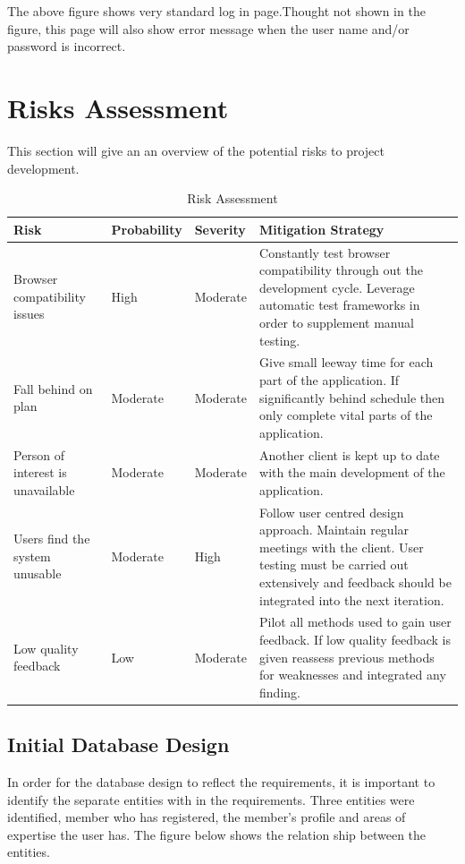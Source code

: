 \documentclass[a4paper,oneside,11pt]{report}
\begin{document}
The above figure shows very standard log in page.Thought not shown in the figure, this page will also show error message when the user name and/or password is incorrect.

\chapter{Risks Assessment}
 	This section will give an an overview of the potential risks to project development.
\begin{center}
	\begin{table}[!ht]
    \begin{tabular}[ht]{| l | l | l | p{5cm} |}
    \hline
    Risk & Probability & Severity & Mitigation Strategy \\ 
    \hline
    Browser compatibility issues & High & Moderate & Constantly test browser compatibility through out the development cycle. Leverage automatic test frameworks in order to supplement manual testing.\\ \hline
    Fall behind on plan & Moderate & Moderate & Give small leeway time for each part of the application. If significantly behind schedule then only complete vital parts of the application.  \\ \hline
    Person of interest is unavailable & Moderate & Moderate &  Another client is kept up to date with the main development of the application.\\ 
    \hline
Users find the system unusable & Moderate & High & Follow user centred design approach. Maintain regular meetings with the client. User testing must be carried out extensively and feedback should be integrated into the next iteration. \\ 
    \hline
    Low quality feedback & Low & Moderate & Pilot all methods used to gain user feedback. If low quality feedback is given reassess previous methods for weaknesses and integrated any finding. \\ 
    \hline
    
    \end{tabular}
    \caption{Risk Assessment}
\label{tab:xyz}
    \end{table}
    \end{center}




\section{Initial Database Design}
In order for the database design to reflect the requirements, it is important to identify the separate entities with in the requirements. Three entities were identified, member who has registered, the member's profile and areas of expertise the user has. The figure below shows the relation ship between the entities.
\end{document}
